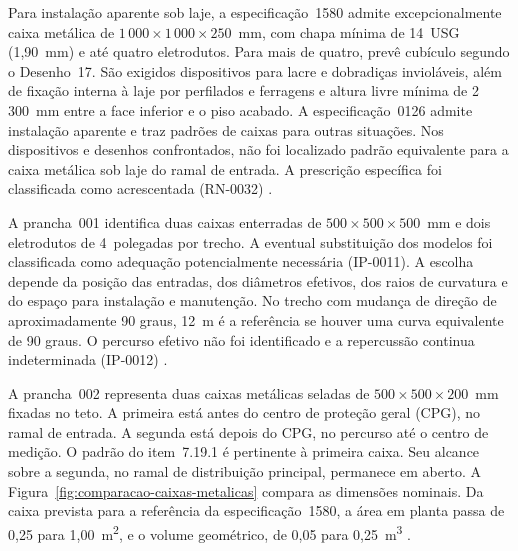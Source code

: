 Para instalação aparente sob laje, a especificação~1580 admite excepcionalmente caixa metálica de \(1\,000\times1\,000\times250\)~mm, com chapa mínima de 14~USG (1,90~mm) e até quatro eletrodutos. Para mais de quatro, prevê cubículo segundo o Desenho~17. São exigidos dispositivos para lacre e dobradiças invioláveis, além de fixação interna à laje por perfilados e ferragens e altura livre mínima de 2\,300~mm entre a face inferior e o piso acabado. A especificação~0126 admite instalação aparente e traz padrões de caixas para outras situações. Nos dispositivos e desenhos confrontados, não foi localizado padrão equivalente para a caixa metálica sob laje do ramal de entrada. A prescrição específica foi classificada como acrescentada (RN-0032) \cite[item~7.6.1.4 e Desenhos~003.02 e~003.17]{enel0126}\cite[item~7.19.1 e Desenho~17]{enel1580}.

A prancha~001 identifica duas caixas enterradas de \(500\times500\times500\)~mm e dois eletrodutos de 4~polegadas por trecho. A eventual substituição dos modelos foi classificada como adequação potencialmente necessária (IP-0011). A escolha depende da posição das entradas, dos diâmetros efetivos, dos raios de curvatura e do espaço para instalação e manutenção. No trecho com mudança de direção de aproximadamente 90 graus, 12~m é a referência se houver uma curva equivalente de 90 graus. O percurso efetivo não foi identificado e a repercussão continua indeterminada (IP-0012) \cite[prancha~001]{palatiumpranchas2025}\cite[item~7.19.1 e Desenho~18]{enel1580}.

A prancha~002 representa duas caixas metálicas seladas de \(500\times500\times200\)~mm fixadas no teto. A primeira está antes do centro de proteção geral (CPG), no ramal de entrada. A segunda está depois do CPG, no percurso até o centro de medição. O padrão do item~7.19.1 é pertinente à primeira caixa. Seu alcance sobre a segunda, no ramal de distribuição principal, permanece em aberto. A Figura~\ref{fig:comparacao-caixas-metalicas} compara as dimensões nominais. Da caixa prevista para a referência da especificação~1580, a área em planta passa de 0,25 para 1,00~m\textsuperscript{2}, e o volume geométrico, de 0,05 para 0,25~m\textsuperscript{3} \cite[pranchas~002, 003 e~005]{palatiumpranchas2025}\cite[item~7.19.1]{enel1580}.

